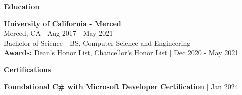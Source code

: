 \documentclass[10pt]{article}
\begin{document}
\begin{center}
    \textbf{Education}
    \hrulefill
\end{center}
\textbf{University of California - Merced}\\
Merced, CA | Aug 2017 - May 2021\\
Bachelor of Science - BS, Computer Science and Engineering\\
\textbf{Awards:} Dean's Honor List, Chancellor's Honor List | Dec 2020 - May 2021

\begin{center}
    \textbf{Certifications}
    \hrulefill
\end{center}
\textbf{Foundational C\# with Microsoft Developer Certification} | Jan 2024
\end{document}
